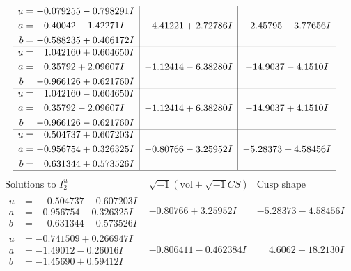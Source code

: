 \documentclass[1p]{elsarticle_modified}
\theoremstyle{definition}
\newcommand{\I}{\sqrt{-1}}
\begin{document}
$$\begin{array}{c|c|c}
\begin{aligned}
u &= -0.079255 - 0.798291 I \\
a &= \phantom{-}0.40042 - 1.42271 I \\
b &= -0.588235 + 0.406172 I\end{aligned}
 & \phantom{-}4.41221 + 2.72786 I & \phantom{-}2.45795 - 3.77656 I \\ \hline\begin{aligned}
u &= \phantom{-}1.042160 + 0.604650 I \\
a &= \phantom{-}0.35792 + 2.09607 I \\
b &= -0.966126 + 0.621760 I\end{aligned}
 & -1.12414 - 6.38280 I & -14.9037 - 4.1510 I \\ \hline\begin{aligned}
u &= \phantom{-}1.042160 - 0.604650 I \\
a &= \phantom{-}0.35792 - 2.09607 I \\
b &= -0.966126 - 0.621760 I\end{aligned}
 & -1.12414 + 6.38280 I & -14.9037 + 4.1510 I \\ \hline\begin{aligned}
u &= \phantom{-}0.504737 + 0.607203 I \\
a &= -0.956754 + 0.326325 I \\
b &= \phantom{-}0.631344 + 0.573526 I\end{aligned}
 & -0.80766 - 3.25952 I & -5.28373 + 4.58456 I\\
 \hline 
 \end{array}$$\newpage$$\begin{array}{c|c|c}  
\text{Solutions to }I^u_{2}& \I (\text{vol} + \sqrt{-1}CS) & \text{Cusp shape}\\
 \hline 
\begin{aligned}
u &= \phantom{-}0.504737 - 0.607203 I \\
a &= -0.956754 - 0.326325 I \\
b &= \phantom{-}0.631344 - 0.573526 I\end{aligned}
 & -0.80766 + 3.25952 I & -5.28373 - 4.58456 I \\ \hline\begin{aligned}
u &= -0.741509 + 0.266947 I \\
a &= -1.49012 - 0.26016 I \\
b &= -1.45690 + 0.59412 I\end{aligned}
 & -0.806411 - 0.462384 I & \phantom{-}4.6062 + 18.2130 I \\ \hline\begin{aligned}

\end{aligned}
\end{array}$$
\end{document}
